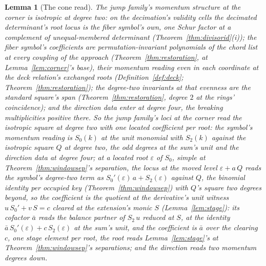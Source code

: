 \documentclass[11pt]{article}
\newtheorem{lemma}{Lemma}
\theoremstyle{definition}
\begin{document}
\begin{lemma}[The cone read]\label{lem:cone}
The jump family's momentum structure at the corner is isotropic at
degree two: on the decimation's validity cells the decimated determinant's
root locus is the fiber symbol's own, one Schur factor at a
complement of unequal-membered determinant
(Theorem~\ref{thm:divisorid}(i)); the fiber
symbol's coefficients are permutation-invariant polynomials of the
chord list at every coupling of the approach
(Theorem~\ref{thm:restoration}, at Lemma~\ref{lem:corner}'s base),
their momentum reading even in each coordinate at the deck
relation's exchanged roots (Definition~\ref{def:deck};
Theorem~\ref{thm:restoration});
the degree-two invariants at that evenness are the standard
square's span
(Theorem~\ref{thm:restoration}, degree $2$ at the rings'
coincidence);
and the direction data enter at degree four, the breaking
multiplicities positive there. So the jump family's loci at the
corner read the isotropic square at degree two with one located
coefficient per root: the symbol's momentum reading is $S_0(k)$ at
the unit monomial with $S_2(k)$ against the isotropic square $Q$
at degree two, the odd degrees at the sum's unit and the direction
data at degree four; at a located root $\varepsilon$ of $S_0$,
simple at Theorem~\ref{thm:windowsep}'s separation, the locus at
the moved level $\varepsilon+a\,Q$ reads the symbol's degree-two
term as $S_0'(\varepsilon)\,a+S_2(\varepsilon)$ against $Q$, the
binomial identity per occupied key (Theorem~\ref{thm:windowsep})
with $Q$'s square two degrees beyond, so the coefficient is the
quotient at the derivative's unit witness $u\,S_0'+v\,S=c$ cleared
at the extension's monic $S$ (Lemma~\ref{lem:stage}): its cofactor
$\bar a$ reads the balance partner of $S_2\,u$ reduced at $S$, at
the identity $\bar a\,S_0'(\varepsilon)+c\,S_2(\varepsilon)$ at
the sum's unit, and the coefficient is $\bar a$ over the clearing
$c$, one stage element per root, the root reads
Lemma~\ref{lem:stage}'s at Theorem~\ref{thm:windowsep}'s
separations; and the direction reads two momentum degrees down.
\end{lemma}
\end{document}
